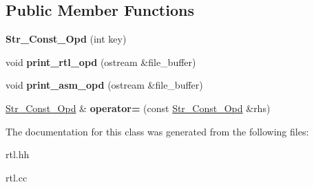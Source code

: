 \subsection*{Public Member Functions}
\begin{DoxyCompactItemize}
\item 
\mbox{\label{classStr__Const__Opd_a8bb243cd26dace9ca10edd5c9f331239}} 
{\bfseries Str\+\_\+\+Const\+\_\+\+Opd} (int key)
\item 
\mbox{\label{classStr__Const__Opd_a49398f49a7e92c8a0f4f18e170ea77a7}} 
void {\bfseries print\+\_\+rtl\+\_\+opd} (ostream \&file\+\_\+buffer)
\item 
\mbox{\label{classStr__Const__Opd_ae2fbb1a1b57eb5e89b9fdaf25175f029}} 
void {\bfseries print\+\_\+asm\+\_\+opd} (ostream \&file\+\_\+buffer)
\item 
\mbox{\label{classStr__Const__Opd_a2f37f0660f6df00b90d13d9f69df645d}} 
\hyperlink{classStr__Const__Opd}{Str\+\_\+\+Const\+\_\+\+Opd} \& {\bfseries operator=} (const \hyperlink{classStr__Const__Opd}{Str\+\_\+\+Const\+\_\+\+Opd} \&rhs)
\end{DoxyCompactItemize}


The documentation for this class was generated from the following files\+:\begin{DoxyCompactItemize}
\item 
rtl.\+hh\item 
rtl.\+cc\end{DoxyCompactItemize}
